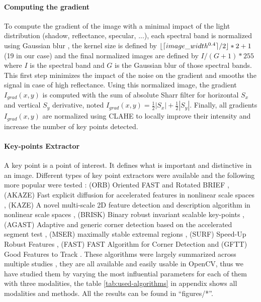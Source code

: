 \documentclass[]{elsarticle}
\DeclarePairedDelimiter\ceil{\lceil}{\rceil}
\DeclarePairedDelimiter\floor{\lfloor}{\rfloor}
\begin{document}
	\paragraph{Computing the gradient} \label{sec:pre-processing} To compute the gradient of the image with a minimal impact of the light distribution (shadow, reflectance, specular, ...),
	each spectral band is normalized using Gaussian blur \cite{sage0303}, the kernel size is defined by $\floor{\ceil{image\_width^{0.4}}/2} * 2 +1$ (19 in our case)
	and the final normalized images are defined by $I/(G+1)*255$ where $I$ is the spectral band and $G$ is the Gaussian blur of those spectral bands.
	This first step minimizes the impact of the noise on the gradient and smooths the signal in case of high reflectance.
	Using this normalized image, the gradient $I_{grad}(x,y)$ is computed with the sum of absolute Sharr filter \cite{Seitz}
	for horizontal $S_x$ and vertical $S_y$ derivative, noted $I_{grad}(x,y)=\frac{1}{2}|S_x|+\frac{1}{2}|S_y|$.
	Finally, all gradients $I_{grad}(x,y)$ are normalized using CLAHE \cite{zuiderveld1994contrast} to locally improve their intensity and increase the number of key points detected.%
	
	\paragraph{Key-points Extractor}
	
	A key point is a point of interest. It defines what is important and distinctive in an image.
	Different types of key point extractors were available and the following more popular were tested :
	(ORB) Oriented FAST and Rotated BRIEF \cite{Rublee:2011:OEA:2355573.2356268}, 
	(AKAZE) Fast explicit diffusion for accelerated features in nonlinear scale spaces \cite{alcantarilla2011fast}, 
	(KAZE) A novel multi-scale 2D feature detection and description algorithm in nonlinear scale spaces \cite{rs10050756}, 
	(BRISK) Binary robust invariant scalable key-points \cite{leutenegger2011brisk}, 
	(AGAST) Adaptive and generic corner detection based on the accelerated segment test \cite{mair2010adaptive}, 
	(MSER) maximally stable extremal regions \cite{donoser2006efficient}, 
	(SURF) Speed-Up Robust Features \cite{bay2006surf}, 
	(FAST) FAST Algorithm for Corner Detection \cite{trajkovic1998fast}
	and (GFTT) Good Features to Track \cite{shi1994good}.
	These algorithms were largely summarized across multiple studies \cite{DantasDiasJunior, Tareen2018ACA, Zhang2016EXTENSIONAE, ali2016comparison},
	they are all available and easily usable in OpenCV, thus we have studied them by varying the most influential parameters for each of them with three modalities,
	the table \ref{tab:used-algorithms} in appendix shows all modalities and methods.
	All the results can be found in ``figures/*''.
	
\end{document}
